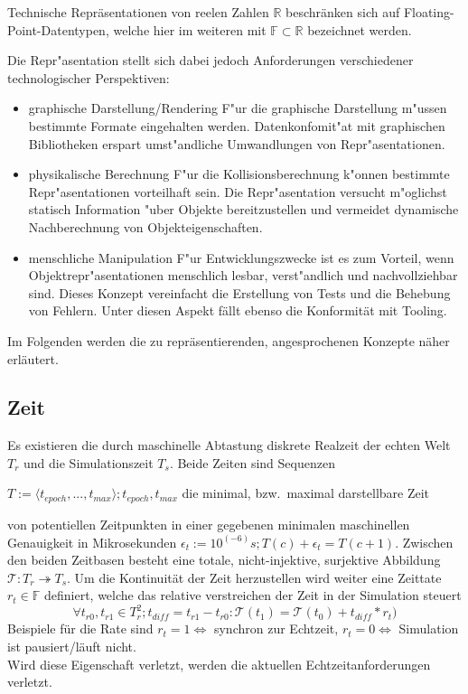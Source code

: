 Technische Repräsentationen von reelen Zahlen $\mathbb{R}$ beschränken sich auf Floating-Point-Datentypen, welche hier im weiteren mit $\mathbb{F} \subset \mathbb{R}$ bezeichnet werden.

Die Repr"asentation stellt sich dabei jedoch Anforderungen verschiedener technologischer Perspektiven:
		\begin{itemize}
			\item graphische Darstellung/Rendering
				F"ur die graphische Darstellung m"ussen bestimmte Formate eingehalten werden. Datenkonfomit"at mit graphischen Bibliotheken erspart umst"andliche Umwandlungen von Repr"asentationen.
			\item physikalische Berechnung
				F"ur die Kollisionsberechnung k"onnen bestimmte Repr"asentationen vorteilhaft sein. Die Repr"asentation versucht m"oglichst statisch Information "uber Objekte bereitzustellen und vermeidet dynamische Nachberechnung von Objekteigenschaften.
			\item menschliche Manipulation
				F"ur Entwicklungszwecke ist es zum Vorteil, wenn Objektrepr"asentationen menschlich lesbar, verst"andlich und nachvollziehbar sind. Dieses Konzept vereinfacht die Erstellung von Tests und die Behebung von Fehlern. Unter diesen Aspekt fällt ebenso die Konformität mit Tooling.
		\end{itemize}

Im Folgenden werden die zu repräsentierenden, angesprochenen Konzepte näher erläutert.

\subsection{Zeit}
Es existieren die durch maschinelle Abtastung diskrete Realzeit der echten Welt $T_r$ und die Simulationszeit $T_s$. Beide Zeiten sind Sequenzen 
\begin{center}
$T:=\langle t_{epoch}, ..., t_{max} \rangle ; t_{epoch}, t_{max}$ die minimal, bzw.~maximal darstellbare Zeit
\end{center} 
von potentiellen Zeitpunkten in einer gegebenen minimalen maschinellen Genauigkeit in Mikrosekunden $\epsilon_t:=10^(-6)s ; T(c) + \epsilon_t = T(c+1)$.
Zwischen den beiden Zeitbasen besteht eine totale, nicht-injektive, surjektive Abbildung $\mathcal{T}:T_r \twoheadrightarrow T_s$.
Um die Kontinuität der Zeit herzustellen wird weiter eine Zeittate $r_t \in \mathbb{F}$ definiert, welche das relative verstreichen der Zeit in der Simulation steuert $$\forall t_{r0},  t_{r1} \in T_r^2 ; t_{diff}=t_{r1}-t_{r0} : \mathcal{T}(t_1) = \mathcal{T}(t_0) + t_{diff}*r_t)$$
Beispiele für die Rate sind $r_t = 1 \Leftrightarrow$ synchron zur Echtzeit, $r_t = 0 \Leftrightarrow$ Simulation ist pausiert/läuft nicht.\\
Wird diese Eigenschaft verletzt, werden die aktuellen Echtzeitanforderungen verletzt.

